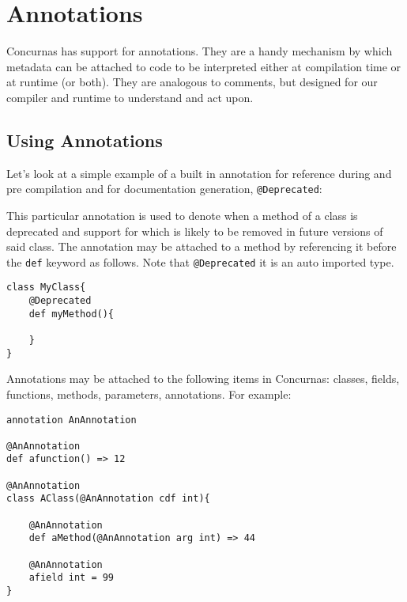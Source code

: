 \documentclass[conc-doc]{subfiles}
\begin{document}
	
	\chapter[Annotations]{Annotations}


Concurnas has support for annotations. They are a handy mechanism by which metadata can be attached to code to be interpreted either at compilation time or at runtime (or both). They are analogous to comments, but designed for our compiler and runtime to understand and act upon.


\section{Using Annotations}
Let's look at a simple example of a built in annotation for reference during and pre compilation and for documentation generation, \lstinline{@Deprecated}:

This particular annotation is used to denote when a method of a class is deprecated and support for which is likely to be removed in future versions of said class. The annotation may be attached to a method by referencing it before the \lstinline{def} keyword as follows. Note that \lstinline{@Deprecated} it is an auto imported type.

\begin{lstlisting}
class MyClass{
	@Deprecated
	def myMethod(){
		
	}
}
\end{lstlisting}

Annotations may be attached to the following items in Concurnas: classes, fields, functions, methods, parameters, annotations. For example:

\begin{lstlisting}
annotation AnAnnotation

@AnAnnotation
def afunction() => 12

@AnAnnotation
class AClass(@AnAnnotation cdf int){
	
	@AnAnnotation
	def aMethod(@AnAnnotation arg int) => 44
	
	@AnAnnotation
	afield int = 99
}
\end{lstlisting}
\end{document}
